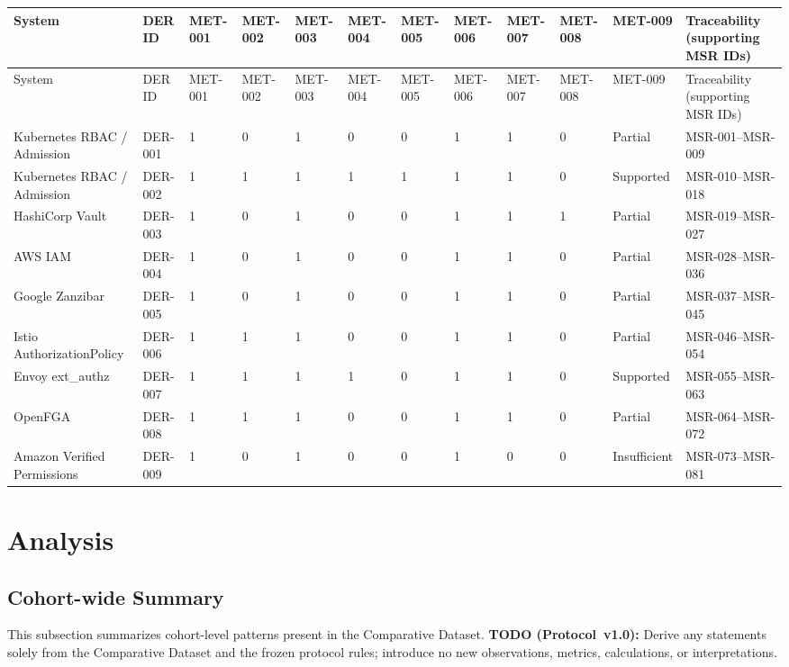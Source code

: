 \documentclass{article}
\begin{document}
{\scriptsize
\setlength{\tabcolsep}{3pt}
\renewcommand{\arraystretch}{1.1}
\begin{longtable}{@{}p{}p{}p{}p{}p{}p{}p{}p{}p{}p{}p{}p{}@{}}
\toprule
System & DER ID & MET-001 & MET-002 & MET-003 & MET-004 & MET-005 & MET-006 & MET-007 & MET-008 & MET-009 & Traceability (supporting MSR IDs)\\
\midrule
\endfirsthead
\toprule
System & DER ID & MET-001 & MET-002 & MET-003 & MET-004 & MET-005 & MET-006 & MET-007 & MET-008 & MET-009 & Traceability (supporting MSR IDs)\\
\midrule
\endhead
Kubernetes RBAC / Admission & DER-001 & 1 & 0 & 1 & 0 & 0 & 1 & 1 & 0 & Partial & MSR-001--MSR-009\\
Kubernetes RBAC / Admission & DER-002 & 1 & 1 & 1 & 1 & 1 & 1 & 1 & 0 & Supported & MSR-010--MSR-018\\
HashiCorp Vault & DER-003 & 1 & 0 & 1 & 0 & 0 & 1 & 1 & 1 & Partial & MSR-019--MSR-027\\
AWS IAM & DER-004 & 1 & 0 & 1 & 0 & 0 & 1 & 1 & 0 & Partial & MSR-028--MSR-036\\
Google Zanzibar & DER-005 & 1 & 0 & 1 & 0 & 0 & 1 & 1 & 0 & Partial & MSR-037--MSR-045\\
Istio AuthorizationPolicy & DER-006 & 1 & 1 & 1 & 0 & 0 & 1 & 1 & 0 & Partial & MSR-046--MSR-054\\
Envoy ext\_authz & DER-007 & 1 & 1 & 1 & 1 & 0 & 1 & 1 & 0 & Supported & MSR-055--MSR-063\\
OpenFGA & DER-008 & 1 & 1 & 1 & 0 & 0 & 1 & 1 & 0 & Partial & MSR-064--MSR-072\\
Amazon Verified Permissions & DER-009 & 1 & 0 & 1 & 0 & 0 & 1 & 0 & 0 & Insufficient & MSR-073--MSR-081\\
\bottomrule
\end{longtable}
}

\section*{Analysis}

\subsection*{Cohort-wide Summary}
This subsection summarizes cohort-level patterns present in the Comparative Dataset. \textbf{TODO (Protocol~v1.0):} Derive any statements solely from the Comparative Dataset and the frozen protocol rules; introduce no new observations, metrics, calculations, or interpretations.
\end{document}
